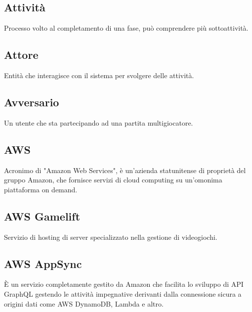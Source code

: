     \subsection{Attività}
    	Processo volto al completamento di una fase, può comprendere più sottoattività.
	\subsection{Attore}
		Entità che interagisce con il sistema per svolgere delle attività.
	\subsection{Avversario}
	    Un utente che sta partecipando ad una partita multigiocatore.
	    
	\subsection{AWS}
		Acronimo di "Amazon Web Services", è un'azienda statunitense di proprietà del gruppo Amazon, che fornisce servizi di cloud computing su un'omonima piattaforma on demand.
	\subsection{AWS Gamelift}
        		Servizio di hosting di server specializzato nella gestione di videogiochi.
	\subsection{AWS AppSync}
	    È un servizio completamente gestito da Amazon che facilita lo sviluppo di API GraphQL gestendo le attività impegnative derivanti dalla connessione sicura a origini dati come AWS DynamoDB, Lambda e altro.
\newpage